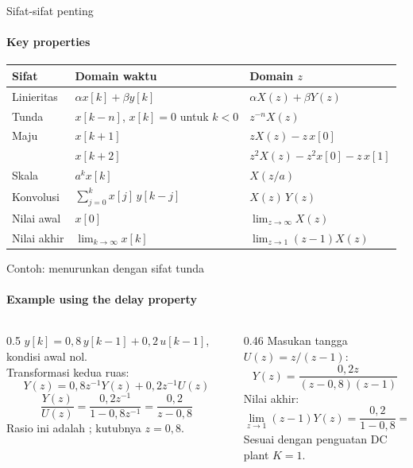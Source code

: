 \documentclass[aspectratio=169,10pt]{beamer}
\begin{document}
\begin{frame}{Sifat-sifat penting}
	\framesubtitle{Key properties}
	\small
	\renewcommand{\arraystretch}{1.3}
	\begin{tabular}{@{}l l l@{}}
		\toprule
		\textbf{Sifat} & \textbf{Domain waktu} & \textbf{Domain $z$} \\
		\midrule
		Linieritas & $\alpha x[k] + \beta y[k]$ & $\alpha X(z) + \beta Y(z)$ \\
		Tunda \en{(delay)} & $x[k-n]$, $x[k]=0$ untuk $k<0$ & $z^{-n}X(z)$ \\
		Maju \en{(advance)} & $x[k+1]$ & $zX(z) - z\,x[0]$ \\
		 & $x[k+2]$ & $z^2X(z) - z^2x[0] - z\,x[1]$ \\
		Skala & $a^k x[k]$ & $X(z/a)$ \\
		Konvolusi & $\sum_{j=0}^{k} x[j]\,y[k-j]$ & $X(z)\,Y(z)$ \\
		Nilai awal & $x[0]$ & $\lim_{z\to\infty} X(z)$ \\
		Nilai akhir & $\lim_{k\to\infty} x[k]$ & $\lim_{z\to 1}(z-1)X(z)$ \\
		\bottomrule
	\end{tabular}

	\vspace{0.2cm}
\end{frame}

\begin{frame}{Contoh: menurunkan dengan sifat tunda}
	\framesubtitle{Example using the delay property}
	\begin{columns}[T]
		\begin{column}{0.5\textwidth}
			\small
			$y[k] = 0{,}8\,y[k-1] + 0{,}2\,u[k-1]$, kondisi awal nol.\\[3pt]
			Transformasi kedua ruas:
			\[
				Y(z) = 0{,}8z^{-1}Y(z) + 0{,}2z^{-1}U(z)
			\]
			\[
				\frac{Y(z)}{U(z)} = \frac{0{,}2z^{-1}}{1-0{,}8z^{-1}} = \frac{0{,}2}{z-0{,}8}
			\]
			Rasio ini adalah ; kutubnya $z=0{,}8$.
		\end{column}
		\begin{column}{0.46\textwidth}
			\small
			Masukan tangga $U(z) = z/(z-1)$:
			\[
				Y(z) = \frac{0{,}2z}{(z-0{,}8)(z-1)}
			\]
			Nilai akhir:
			\[
				\lim_{z\to1}(z-1)Y(z) = \frac{0{,}2}{1-0{,}8} = 1
			\]
			Sesuai dengan penguatan DC plant $K=1$.
		\end{column}
	\end{columns}
\end{frame}
\end{document}
